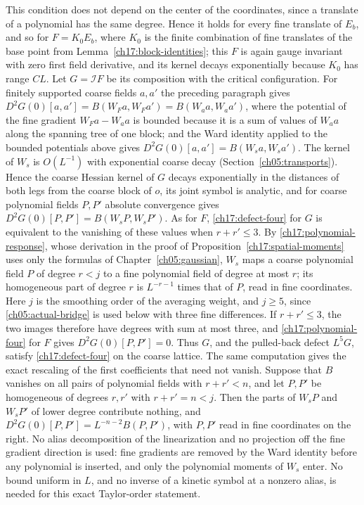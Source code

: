 This condition does not depend on the center of the coordinates, since a translate of a polynomial has the same degree. Hence it holds for every fine translate of $E_b$, and so for $F=K_0E_b$, where $K_0$ is the finite combination of fine translates of the base point from Lemma~\ref{ch17:block-identities}; this $F$ is again gauge invariant with zero first field derivative, and its kernel decays exponentially because $K_0$ has range $CL$.
Let $G=\mathcal IF$ be its composition with the critical configuration. For finitely supported coarse fields $a,a'$ the preceding paragraph gives $D^2G(0)[a,a']=B(W_Fa,W_Fa')=B(W_aa,W_aa')$, where the potential of the fine gradient $W_Fa-W_aa$ is bounded because it is a sum of values of $W_aa$ along the spanning tree of one block; and the Ward identity applied to the bounded potentials above gives $D^2G(0)[a,a']=B(W_sa,W_sa')$. The kernel of $W_s$ is $O(L^{-1})$ with exponential coarse decay (Section~\ref{ch05:transports}).
Hence the coarse Hessian kernel of $G$ decays exponentially in the distances of both legs from the coarse block of $o$, its joint symbol is analytic, and for coarse polynomial fields $P,P'$ absolute convergence gives $D^2G(0)[P,P']=B(W_sP,W_sP')$. As for $F$, \eqref{ch17:defect-four} for $G$ is equivalent to the vanishing of these values when $r+r'\le3$.
By \eqref{ch17:polynomial-response}, whose derivation in the proof of Proposition~\ref{ch17:spatial-moments} uses only the formulas of Chapter~\ref{ch05:gaussian}, $W_s$ maps a coarse polynomial field $P$ of degree $r<j$ to a fine polynomial field of degree at most $r$; its homogeneous part of degree $r$ is $L^{-r-1}$ times that of $P$, read in fine coordinates. Here $j$ is the smoothing order of the averaging weight, and $j\ge5$, since \eqref{ch05:actual-bridge} is used below with three fine differences.
If $r+r'\le3$, the two images therefore have degrees with sum at most three, and \eqref{ch17:polynomial-four} for $F$ gives $D^2G(0)[P,P']=0$. Thus $G$, and the pulled-back defect $L^5G$, satisfy \eqref{ch17:defect-four} on the coarse lattice.
The same computation gives the exact rescaling of the first coefficients that need not vanish. Suppose that $B$ vanishes on all pairs of polynomial fields with $r+r'<n$, and let $P,P'$ be homogeneous of degrees $r,r'$ with $r+r'=n<j$. Then the parts of $W_sP$ and $W_sP'$ of lower degree contribute nothing, and $D^2G(0)[P,P']=L^{-n-2}B(P,P')$, with $P,P'$ read in fine coordinates on the right.
No alias decomposition of the linearization and no projection off the fine gradient direction is used: fine gradients are removed by the Ward identity before any polynomial is inserted, and only the polynomial moments of $W_s$ enter.
No bound uniform in $L$, and no inverse of a kinetic symbol at a nonzero alias, is
needed for this exact Taylor-order statement.


